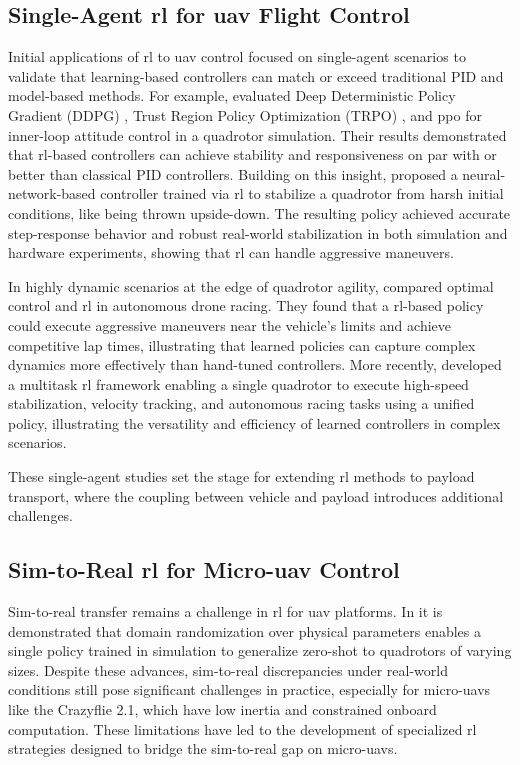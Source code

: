 \subsection{Single-Agent \gls{rl} for \gls{uav} Flight Control}

Initial applications of \gls{rl} to \gls{uav} control focused on single-agent scenarios to validate that learning-based controllers can match or exceed traditional PID and model-based methods. For example, \cite{Koch2018ReinforcementLF} evaluated Deep Deterministic Policy Gradient (DDPG) \cite{Lillicrap2015ContinuousCW}, Trust Region Policy Optimization (TRPO) \cite{Schulman2015TrustRP}, and \gls{ppo} \cite{schulman2017proximal} for inner-loop attitude control in a quadrotor simulation. Their results demonstrated that \gls{rl}-based controllers can achieve stability and responsiveness on par with or better than classical PID controllers. Building on this insight, \cite{Hwangbo2017ControlOA} proposed a neural-network-based controller trained via \gls{rl} to stabilize a quadrotor from harsh initial conditions, like being thrown upside-down. The resulting policy achieved accurate step-response behavior and robust real-world stabilization in both simulation and hardware experiments, showing that \gls{rl} can handle aggressive maneuvers.

In highly dynamic scenarios at the edge of quadrotor agility, \cite{Song2023ReachingTL} compared optimal control and \gls{rl} in autonomous drone racing. They found that a \gls{rl}-based policy could execute aggressive maneuvers near the vehicle's limits and achieve competitive lap times, illustrating that learned policies can capture complex dynamics more effectively than hand-tuned controllers. More recently, \cite{xing_multi-task_2024} developed a multitask \gls{rl} framework enabling a single quadrotor to execute high-speed stabilization, velocity tracking, and autonomous racing tasks using a unified policy, illustrating the versatility and efficiency of learned controllers in complex scenarios. 

These single-agent studies set the stage for extending \gls{rl} methods to payload transport, where the coupling between vehicle and payload introduces additional challenges.

\subsection{Sim-to-Real \gls{rl} for Micro-\gls{uav} Control}
Sim-to-real transfer remains a challenge in \gls{rl} for \gls{uav} platforms. In \cite{molchanov_sim--multi-real_2019} it is demonstrated that domain randomization over physical parameters enables a single policy trained in simulation to generalize zero-shot to quadrotors of varying sizes. Despite these advances, sim-to-real discrepancies under real-world conditions still pose significant challenges in practice, especially for micro-\glspl{uav} like the Crazyflie 2.1, which have low inertia and constrained onboard computation. These limitations have led to the development of specialized \gls{rl} strategies designed to bridge the sim-to-real gap on micro-\glspl{uav}.

